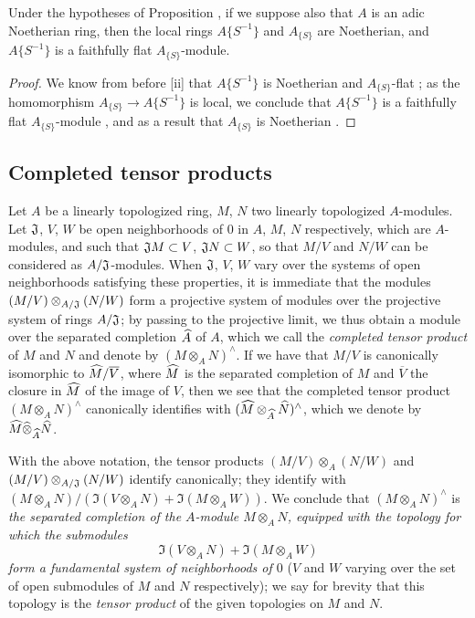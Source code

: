 \begin{cor}[7.6.18]
\label{0.7.6.18}
Under the hypotheses of Proposition , if we suppose also that
$A$ is an adic Noetherian ring, then the local rings $A\{S^{-1}\}$ and $A_{\{S\}}$ are Noetherian,
and $A\{S^{-1}\}$ is a faithfully flat $A_{\{S\}}$-module.
\end{cor}

\begin{proof}
\label{proof-0.7.6.18}
We know from before [ii] that $A\{S^{-1}\}$ is Noetherian and
$A_{\{S\}}$-flat ; as the homomorphism $A_{\{S\}}\to A\{S^{-1}\}$
is local, we conclude that $A\{S^{-1}\}$ is a faithfully flat $A_{\{S\}}$-module
, and as a result that $A_{\{S\}}$ is Noetherian .
\end{proof}

\subsection{Completed tensor products}
\label{subsection-completed-tensor-prods}

\begin{env}[7.7.1]
\label{0.7.7.1}
Let $A$ be a linearly topologized ring, $M$, $N$ two linearly topologized $A$-modules. Let
$\mathfrak{J}$, $V$, $W$ be open neighborhoods of $0$ in $A$, $M$, $N$ respectively, which are
$A$-modules, and such that $\mathfrak{J}M\subset V$, $\mathfrak{J}N\subset W$, so that
$M/V$ and $N/W$ can be considered as $A/\mathfrak{J}$-modules. When $\mathfrak{J}$, $V$, $W$
vary over the systems of open neighborhoods satisfying these properties, it is immediate that the
modules $(M/V)\otimes_{A/\mathfrak{J}}(N/W)$ form a projective system of modules
over the projective system of rings $A/\mathfrak{J}$; by passing to the projective limit, we
thus obtain a module over the separated completion $\widehat{A}$ of $A$, which we call the
\emph{completed tensor product} of $M$ and $N$ and denote by $(M\otimes_A N)^\wedge$. If we have
that $M/V$ is canonically isomorphic to $\widehat{M}/\overline{V}$, where $\widehat{M}$ is the
separated completion of $M$ and $\overline{V}$ the closure in $\widehat{M}$ of the image of $V$,
then we see that the completed tensor product $(M\otimes_A N)^\wedge$ canonically identifies with
$(\widehat{M}\otimes_{\widehat{A}}\widehat{N})^\wedge$, which we denote by
$\widehat{M}\widehat{\otimes}_{\widehat{A}}\widehat{N}$.
\end{env}

\begin{env}[7.7.2]
\label{0.7.7.2}
With the above notation, the tensor products $(M/V)\otimes_A(N/W)$ and
$(M/V)\otimes_{A/\mathfrak{J}}(N/W)$ identify canonically; they identify with
$(M\otimes_A N)/(\Im(V\otimes_A N)+\Im(M\otimes_A W))$. We conclude that $(M\otimes_A N)^\wedge$
is \emph{the separated completion of the $A$-module $M\otimes_A N$, equipped with the topology for
which the submodules
\[
  \Im(V\otimes_A N)+\Im(M\otimes_A W)
\]
form a fundamental system of neighborhoods of $0$} ($V$ and $W$ varying over the set of open submodules
of $M$ and $N$ respectively); we say for brevity that this topology is the \emph{tensor product} of
the given topologies on $M$ and $N$.
\end{env}

